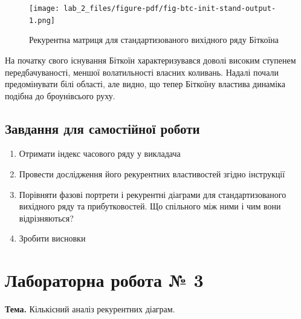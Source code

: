 \documentclass[
  letterpaper,
]{report}
\providecommand{\tightlist}{%
  \setlength{\itemsep}{0pt}\setlength{\parskip}{0pt}}\usepackage{longtable,booktabs,array}
\begin{document}
\begin{figure}[H]

{\centering \texttt{[image: lab\_2\_files/figure-pdf/fig-btc-init-stand-output-1.png]}

}

\caption{\label{fig-btc-init-stand}Рекурентна матриця для
стандартизованого вихідного ряду Біткоїна}

\end{figure}

На початку свого існування Біткоїн характеризувався доволі високим
ступенем передбачуваності, меншої волатильності власних коливань. Надалі
почали предомінувати білі області, але видно, що тепер Біткоїну властива
динаміка подібна до броунівсього руху.

\hypertarget{ux437ux430ux432ux434ux430ux43dux43dux44f-ux434ux43bux44f-ux441ux430ux43cux43eux441ux442ux456ux439ux43dux43eux457-ux440ux43eux431ux43eux442ux438-1}{%
\section{Завдання для самостійної
роботи}\label{ux437ux430ux432ux434ux430ux43dux43dux44f-ux434ux43bux44f-ux441ux430ux43cux43eux441ux442ux456ux439ux43dux43eux457-ux440ux43eux431ux43eux442ux438-1}}

\begin{enumerate}
\def\labelenumi{\arabic{enumi}.}
\tightlist
\item
  Отримати індекс часового ряду у викладача
\item
  Провести дослідження його рекурентних властивостей згідно інструкції
\item
  Порівняти фазові портрети і рекурентні діаграми для стандартизованого
  вихідного ряду та прибутковостей. Що спільного між ними і чим вони
  відрізняються?
\item
  Зробити висновки
\end{enumerate}


\hypertarget{ux43bux430ux431ux43eux440ux430ux442ux43eux440ux43dux430-ux440ux43eux431ux43eux442ux430-3}{%
\chapter{Лабораторна робота №
3}\label{ux43bux430ux431ux43eux440ux430ux442ux43eux440ux43dux430-ux440ux43eux431ux43eux442ux430-3}}

\textbf{Тема.} Кількісний аналіз рекурентних діаграм.
\end{document}
